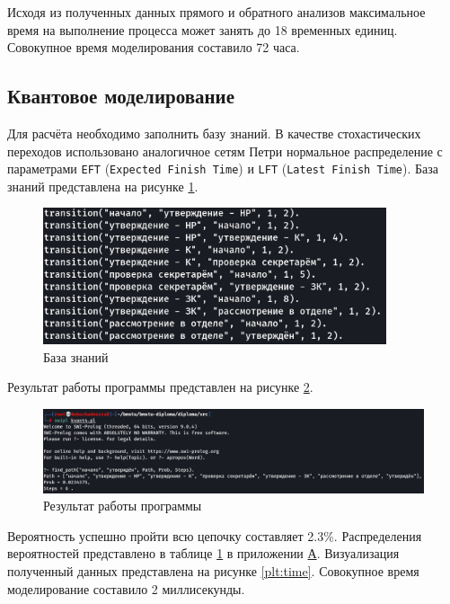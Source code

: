 Исходя из полученных данных прямого и обратного анализов максимальное время на выполнение процесса может занять до 18 временных единиц. Совокупное время моделирования составило 72 часа.

\subsection{Квантовое моделирование}

Для расчёта необходимо заполнить базу знаний. В качестве стохастических переходов использовано аналогичное сетям Петри нормальное распределение с параметрами \texttt{EFT} (\texttt{Expected Finish Time}) и \texttt{LFT} (\texttt{Latest Finish Time}). База знаний представлена на рисунке \ref{fig:knowledge}.

\begin{figure}[h!btp]
	\centering
	\includegraphics[width=0.9\textwidth]{../inc/knowledge.png}
	\caption{База знаний}
	\label{fig:knowledge}
\end{figure}

\pagebreak

Результат работы программы представлен на рисунке \ref{fig:res}.

\begin{figure}[h!]
	\centering
	\includegraphics[width=\textwidth]{../inc/res.png}
	\caption{Результат работы программы}
	\label{fig:res}
\end{figure}

Вероятность успешно пройти всю цепочку составляет 2.3\%. Распределения вероятностей представлено в таблице \hyperref[tab:distrib]{1} в приложении \hyperref[app:table]{А}. Визуализация полученный данных представлена на рисунке \ref{plt:time}. Совокупное время моделирование составило 2 миллисекунды.

